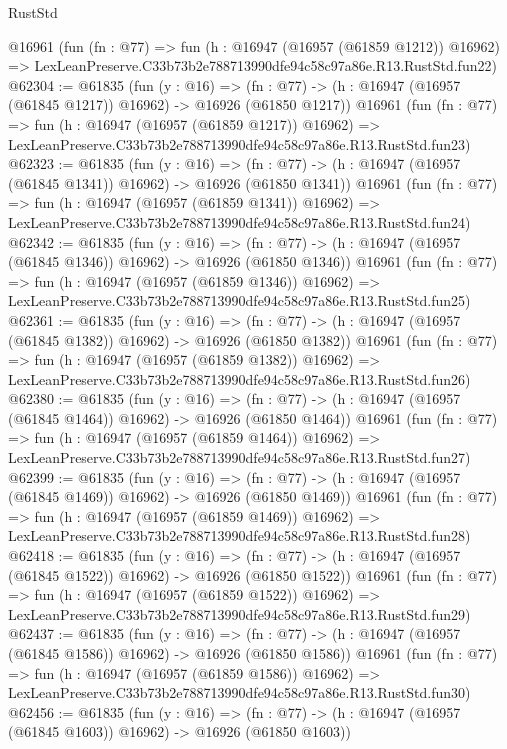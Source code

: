 \begin{lexlean}{RustStd}
\begin{coremodule}
    @16961
    (fun (fn : @77) =>
    fun (h : @16947 (@16957 (@61859 @1212)) @16962) =>
    LexLeanPreserve.C33b73b2e788713990dfe94c58c97a86e.R13.RustStd.fun22)
@62304 := @61835
    (fun (y : @16) =>
    (fn : @77) -> (h : @16947 (@16957 (@61845 @1217)) @16962) -> @16926 (@61850 @1217))
    @16961
    (fun (fn : @77) =>
    fun (h : @16947 (@16957 (@61859 @1217)) @16962) =>
    LexLeanPreserve.C33b73b2e788713990dfe94c58c97a86e.R13.RustStd.fun23)
@62323 := @61835
    (fun (y : @16) =>
    (fn : @77) -> (h : @16947 (@16957 (@61845 @1341)) @16962) -> @16926 (@61850 @1341))
    @16961
    (fun (fn : @77) =>
    fun (h : @16947 (@16957 (@61859 @1341)) @16962) =>
    LexLeanPreserve.C33b73b2e788713990dfe94c58c97a86e.R13.RustStd.fun24)
@62342 := @61835
    (fun (y : @16) =>
    (fn : @77) -> (h : @16947 (@16957 (@61845 @1346)) @16962) -> @16926 (@61850 @1346))
    @16961
    (fun (fn : @77) =>
    fun (h : @16947 (@16957 (@61859 @1346)) @16962) =>
    LexLeanPreserve.C33b73b2e788713990dfe94c58c97a86e.R13.RustStd.fun25)
@62361 := @61835
    (fun (y : @16) =>
    (fn : @77) -> (h : @16947 (@16957 (@61845 @1382)) @16962) -> @16926 (@61850 @1382))
    @16961
    (fun (fn : @77) =>
    fun (h : @16947 (@16957 (@61859 @1382)) @16962) =>
    LexLeanPreserve.C33b73b2e788713990dfe94c58c97a86e.R13.RustStd.fun26)
@62380 := @61835
    (fun (y : @16) =>
    (fn : @77) -> (h : @16947 (@16957 (@61845 @1464)) @16962) -> @16926 (@61850 @1464))
    @16961
    (fun (fn : @77) =>
    fun (h : @16947 (@16957 (@61859 @1464)) @16962) =>
    LexLeanPreserve.C33b73b2e788713990dfe94c58c97a86e.R13.RustStd.fun27)
@62399 := @61835
    (fun (y : @16) =>
    (fn : @77) -> (h : @16947 (@16957 (@61845 @1469)) @16962) -> @16926 (@61850 @1469))
    @16961
    (fun (fn : @77) =>
    fun (h : @16947 (@16957 (@61859 @1469)) @16962) =>
    LexLeanPreserve.C33b73b2e788713990dfe94c58c97a86e.R13.RustStd.fun28)
@62418 := @61835
    (fun (y : @16) =>
    (fn : @77) -> (h : @16947 (@16957 (@61845 @1522)) @16962) -> @16926 (@61850 @1522))
    @16961
    (fun (fn : @77) =>
    fun (h : @16947 (@16957 (@61859 @1522)) @16962) =>
    LexLeanPreserve.C33b73b2e788713990dfe94c58c97a86e.R13.RustStd.fun29)
@62437 := @61835
    (fun (y : @16) =>
    (fn : @77) -> (h : @16947 (@16957 (@61845 @1586)) @16962) -> @16926 (@61850 @1586))
    @16961
    (fun (fn : @77) =>
    fun (h : @16947 (@16957 (@61859 @1586)) @16962) =>
    LexLeanPreserve.C33b73b2e788713990dfe94c58c97a86e.R13.RustStd.fun30)
@62456 := @61835
    (fun (y : @16) =>
    (fn : @77) -> (h : @16947 (@16957 (@61845 @1603)) @16962) -> @16926 (@61850 @1603))

\end{coremodule}
\end{lexlean}
